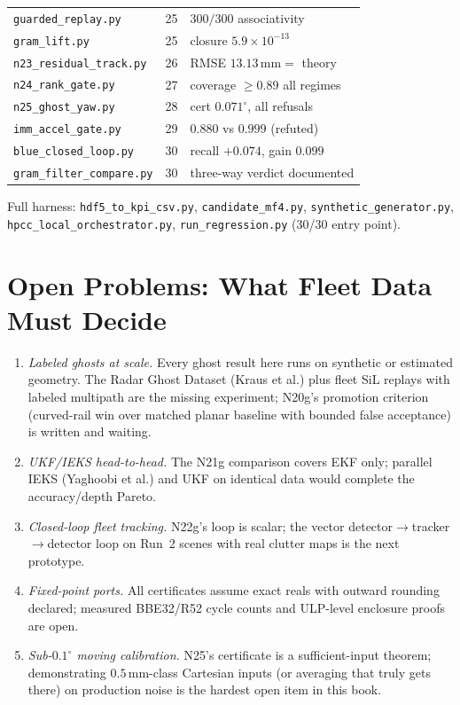 \documentclass[11pt,oneside]{book}
\begin{document}
{\begin{tabularx}{\linewidth}{@{}lcp{7.5cm}@{}}
\texttt{guarded\_replay.py} & 25 & $300/300$ associativity \\
\texttt{gram\_lift.py} & 25 & closure $5.9\times10^{-13}$ \\
\texttt{n23\_residual\_track.py} & 26 & RMSE $13.13\,\mathrm{mm}=$ theory \\
\texttt{n24\_rank\_gate.py} & 27 & coverage $\ge0.89$ all regimes \\
\texttt{n25\_ghost\_yaw.py} & 28 & cert $0.071^\circ$, all refusals \\
\texttt{imm\_accel\_gate.py} & 29 & $0.880$ vs $0.999$ (refuted) \\
\texttt{blue\_closed\_loop.py} & 30 & recall $+0.074$, gain $0.099$ \\
\texttt{gram\_filter\_compare.py} & 30 & three-way verdict documented \\
\bottomrule
\end{tabularx}}
Full harness: \texttt{hdf5\_to\_kpi\_csv.py}, \texttt{candidate\_mf4.py},
\texttt{synthetic\_generator.py}, \texttt{hpcc\_local\_orchestrator.py},
\texttt{run\_regression.py} (30/30 entry point).

\chapter{Open Problems: What Fleet Data Must Decide}
\label{ch:open}

\begin{enumerate}
\item \emph{Labeled ghosts at scale.} Every ghost result here runs on
synthetic or estimated geometry. The Radar Ghost Dataset (Kraus et al.)
plus fleet SiL replays with labeled multipath are the missing experiment;
N20g's promotion criterion (curved-rail win over matched planar baseline
with bounded false acceptance) is written and waiting.
\item \emph{UKF/IEKS head-to-head.} The N21g comparison covers EKF only;
parallel IEKS (Yaghoobi et al.) and UKF on identical data would complete
the accuracy/depth Pareto.
\item \emph{Closed-loop fleet tracking.} N22g's loop is scalar; the vector
detector$\to$tracker$\to$detector loop on Run~2 scenes with real clutter
maps is the next prototype.
\item \emph{Fixed-point ports.} All certificates assume exact reals with
outward rounding declared; measured BBE32/R52 cycle counts and ULP-level
enclosure proofs are open.
\item \emph{Sub-$0.1^\circ$ moving calibration.} N25's certificate is a
sufficient-input theorem; demonstrating $0.5\,\mathrm{mm}$-class Cartesian
inputs (or averaging that truly gets there) on production noise is the
hardest open item in this book.
\end{enumerate}
\end{document}
